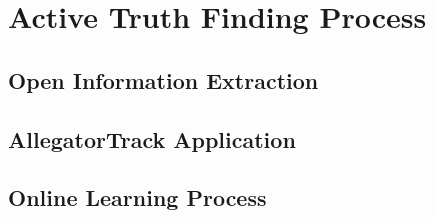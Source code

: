 \section{Active Truth Finding Process}

\subsection{Open Information Extraction}

\subsection{AllegatorTrack Application}

\subsection{Online Learning Process}
